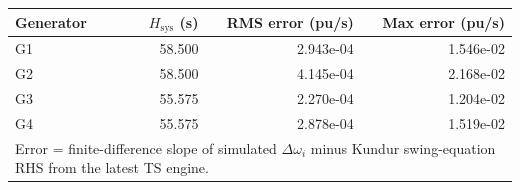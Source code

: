\begingroup\footnotesize\setlength{\tabcolsep}{5pt}
\begin{tabular}{l r r r}
\toprule
Generator & $H_{\mathrm{sys}}$ (s) & RMS error (pu/s) & Max error (pu/s)\\
\midrule
G1 & 58.500 & 2.943e-04 & 1.546e-02\\
G2 & 58.500 & 4.145e-04 & 2.168e-02\\
G3 & 55.575 & 2.270e-04 & 1.204e-02\\
G4 & 55.575 & 2.878e-04 & 1.519e-02\\
\bottomrule
\multicolumn{4}{l}{\scriptsize Error = finite-difference slope of simulated $\Delta\omega_i$ minus Kundur swing-equation RHS from the latest TS engine.}\\
\end{tabular}
\endgroup
